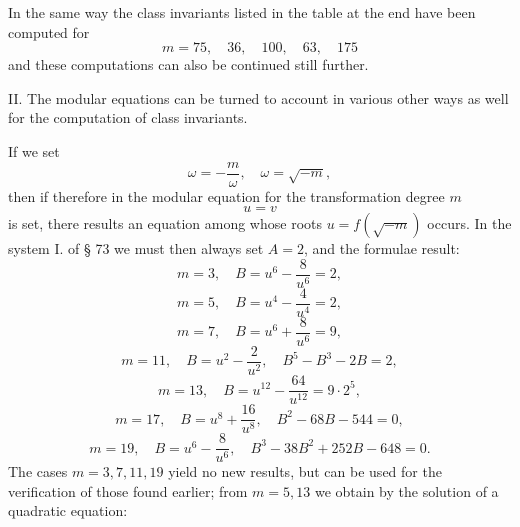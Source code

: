 In the same way the class invariants listed in the table at the end
have been computed for
\[
m=75,\quad 36,\quad 100,\quad 63,\quad 175
\]
and these computations can also be continued still further.

II. The  modular equations can be turned to account in
various other ways as well for the computation of class
invariants.

If we set
\[
\omega=-\frac{m}{\omega},\quad \omega=\sqrt{-m},
\]
then
if therefore in the modular equation for the transformation degree $m$
\[
u=v
\]
is set, there results an equation among whose roots
$u=f(\sqrt{-m})$ occurs. In the system I. of § 73 we must then
always set $A=2$, and the formulae result:
\[
m=3,\quad B=u^6-\frac{8}{u^6}=2,
\]
\[
m=5,\quad B=u^4-\frac{4}{u^4}=2,
\]
\[
m=7,\quad B=u^6+\frac{8}{u^6}=9,
\]
\[
m=11,\quad B=u^2-\frac{2}{u^2},\quad B^5-B^3-2B=2,
\]
\[
m=13,\quad B=u^{12}-\frac{64}{u^{12}}=9\cdot2^5,
\]
\[
m=17,\quad B=u^8+\frac{16}{u^8},\quad B^2-68B-544=0,
\]
\[
m=19,\quad B=u^6-\frac{8}{u^6},\quad B^3-38B^2+252B-648=0.
\]
The cases $m=3,7,11,19$ yield no new results, but can be used
for the verification of those found earlier;
from $m=5,13$ we obtain by the solution of a
quadratic equation:
